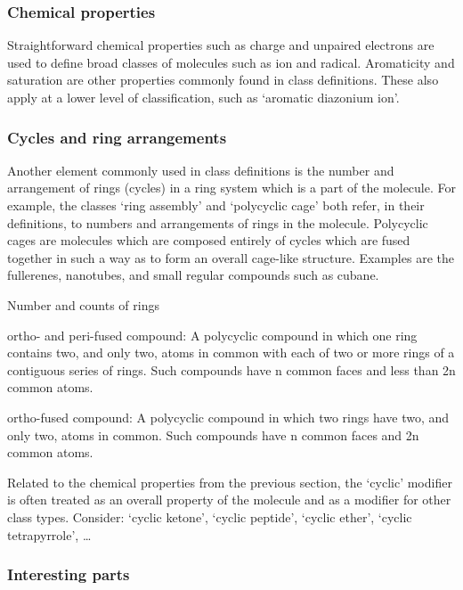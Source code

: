 \documentclass[10pt]{bmc_article}
\newenvironment{bmcformat}{\baselineskip20pt\sloppy\setboolean{publ}{false}}{\baselineskip20pt\sloppy}
\begin{document}
\begin{bmcformat}
\subsubsection*{Chemical properties}

Straightforward chemical properties such as charge and unpaired electrons are used to define broad classes of molecules such as ion and radical. Aromaticity and saturation are other properties commonly found in class definitions. These also apply at a lower level of classification, such as `aromatic diazonium ion'.  


\subsubsection*{Cycles and ring arrangements}

Another element commonly used in class definitions is the number and arrangement of rings (cycles) in a ring system which is a part of the molecule. For example, the classes `ring assembly' and `polycyclic cage' both refer, in their definitions, to numbers and arrangements of rings in the molecule. Polycyclic cages are molecules which are composed entirely of cycles which are fused together in such a way as to form an overall cage-like structure.  Examples are the fullerenes, nanotubes, and small regular compounds such as cubane. 

Number and counts of rings


ortho- and peri-fused compound: A polycyclic compound in which one ring contains two, and only two, atoms in common with each of two or more rings of a contiguous series of rings. Such compounds have n common faces and less than 2n common atoms.

ortho-fused compound: A polycyclic compound in which two rings have two, and only two, atoms in common. Such compounds have n common faces and 2n common atoms.


Related to the chemical properties from the previous section, the `cyclic' modifier is often treated as an overall property of the molecule and as a modifier for other class types. Consider: `cyclic ketone', `cyclic peptide', `cyclic ether', `cyclic tetrapyrrole', \ldots


\subsubsection*{Interesting parts}


\end{bmcformat}
\end{document}
